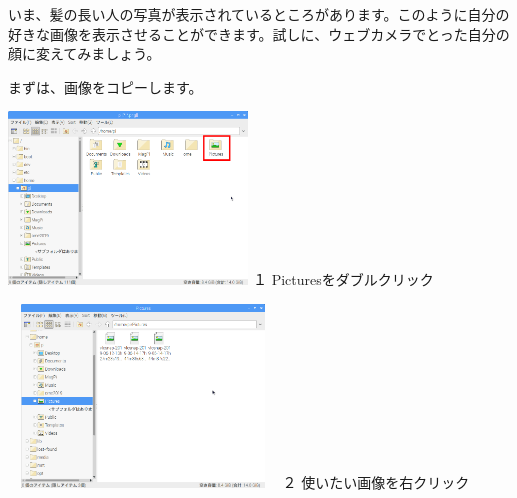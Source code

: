 \documentclass[a4paper,12pt]{jarticle}
\begin{document}
いま、髪の長い人の写真が表示されているところがあります。このように自分の好きな画像を表示させることができます。試しに、ウェブカメラでとった自分の顔に変えてみましょう。

まずは、画像をコピーします。


\bigskip

\begin{minipage}{6.377cm}
\includegraphics[width=6.359cm,height=4.597cm]{textbook-img164.png}
\newline
１ Picturesをダブルクリック
\end{minipage}
	\hspace{10mm}
\begin{minipage}{7.465cm}
\includegraphics[width=7.142cm,height=4.873cm]{textbook-img162.png}
\newline
２ 使いたい画像を右クリック
\end{minipage}

\bigskip
\end{document}
